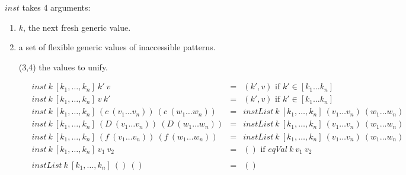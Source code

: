$inst$ takes 4 arguments:

\begin{enumerate}
  \item $k$, the next fresh generic value.
  \item a set of flexible generic values of inaccessible patterns.
  \item [(3,4)] the values to unify.
\end{enumerate}

\begin{figure}[H]
  \begin{equation*}
    \begin{aligned}
      inst \: k \: [k_1,\dots,k_n] \: k' \: v                                            & =              & (k', v) \textrm{ if } k' \in [k_1 \dots k_n]                                                                                                                      \\
      inst \: k \: [k_1,\dots,k_n] \: v \: k'                                            & =              & (k', v) \textrm{ if } k' \in [k_1 \dots k_n]                                                                                                                      \\
      inst \: k \: [k_1,\dots,k_n] \: (c \: (v_1 \dots v_n)) \: (c \: (w_1 \dots w_n))   & =              & instList \: k \: [k_1,\dots,k_n] \: (v_1 \dots v_n) \: (w_1 \dots w_n)                                                                                            \\
      inst \: k \: [k_1,\dots,k_n] \: (D \: (v_1 \dots v_n)) \: (D \: (w_1 \dots w_n))   & =              & instList \: k \: [k_1,\dots,k_n] \: (v_1 \dots v_n) \: (w_1 \dots w_n)                                                                                            \\
      inst \: k \: [k_1,\dots,k_n] \: (f \: (v_1 \dots v_n)) \: (f \: (w_1 \dots w_n))   & =              & instList \: k \: [k_1,\dots,k_n] \: (v_1 \dots v_n) \: (w_1 \dots w_n)                                                                                            \\
      inst \: k \: [k_1,\dots,k_n] \: v_1 \: v_2                                         & =              & () \textrm{ if } eqVal \: k \: v_1 \: v_2                                                                                                                         \\
      \\
      instList \: k \: [k_1,\dots,k_n] \: () \: ()                                       & =              & ()                                                                                                                                                                \\

\end{aligned}
\end{equation*}
\end{figure}
